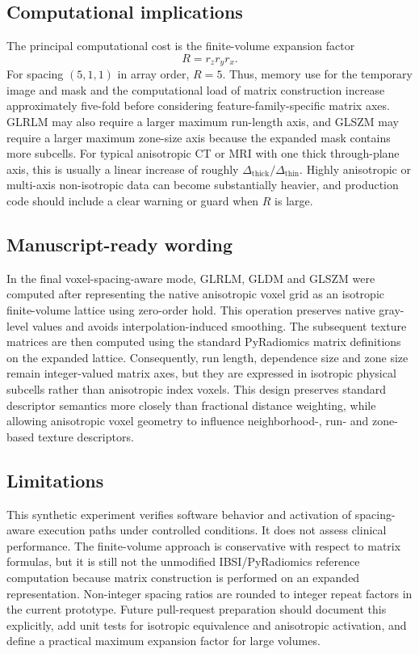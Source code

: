 \subsection{Computational implications}

The principal computational cost is the finite-volume expansion factor
\[
R = r_z r_y r_x.
\]
For spacing $(5,1,1)$ in array order, $R=5$. Thus, memory use for the temporary image and mask and the computational
load of matrix construction increase approximately five-fold before considering feature-family-specific matrix axes.
GLRLM may also require a larger maximum run-length axis, and GLSZM may require a larger maximum zone-size axis because
the expanded mask contains more subcells. For typical anisotropic CT or MRI with one thick through-plane axis, this is
usually a linear increase of roughly $\Delta_\mathrm{thick}/\Delta_\mathrm{thin}$. Highly anisotropic or multi-axis
non-isotropic data can become substantially heavier, and production code should include a clear warning or guard when
$R$ is large.

\subsection{Manuscript-ready wording}

In the final voxel-spacing-aware mode, GLRLM, GLDM and GLSZM were computed after representing the native anisotropic
voxel grid as an isotropic finite-volume lattice using zero-order hold. This operation preserves native gray-level
values and avoids interpolation-induced smoothing. The subsequent texture matrices are then computed using the
standard PyRadiomics matrix definitions on the expanded lattice. Consequently, run length, dependence size and zone
size remain integer-valued matrix axes, but they are expressed in isotropic physical subcells rather than anisotropic
index voxels. This design preserves standard descriptor semantics more closely than fractional distance weighting,
while allowing anisotropic voxel geometry to influence neighborhood-, run- and zone-based texture descriptors.

\subsection{Limitations}

This synthetic experiment verifies software behavior and activation of spacing-aware execution paths under controlled
conditions. It does not assess clinical performance. The finite-volume approach is conservative with respect to matrix
formulas, but it is still not the unmodified IBSI/PyRadiomics reference computation because matrix construction is
performed on an expanded representation. Non-integer spacing ratios are rounded to integer repeat factors in the
current prototype. Future pull-request preparation should document this explicitly, add unit tests for isotropic
equivalence and anisotropic activation, and define a practical maximum expansion factor for large volumes.

